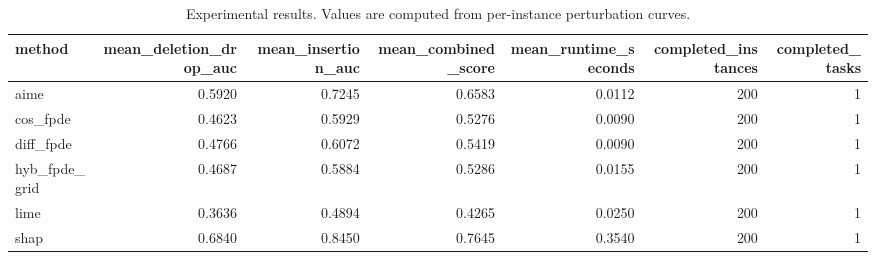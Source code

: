 \begin{table}[t]
\caption{Experimental results. Values are computed from per-instance perturbation curves.}
\label{tab:main_results_computed}
\centering
\begin{tabular}{lrrrrrr}
\toprule
method & mean\_deletion\_drop\_auc & mean\_insertion\_auc & mean\_combined\_score & mean\_runtime\_seconds & completed\_instances & completed\_tasks \\
\midrule
aime & 0.5920 & 0.7245 & 0.6583 & 0.0112 & 200 & 1 \\
cos\_fpde & 0.4623 & 0.5929 & 0.5276 & 0.0090 & 200 & 1 \\
diff\_fpde & 0.4766 & 0.6072 & 0.5419 & 0.0090 & 200 & 1 \\
hyb\_fpde\_grid & 0.4687 & 0.5884 & 0.5286 & 0.0155 & 200 & 1 \\
lime & 0.3636 & 0.4894 & 0.4265 & 0.0250 & 200 & 1 \\
shap & 0.6840 & 0.8450 & 0.7645 & 0.3540 & 200 & 1 \\
\bottomrule
\end{tabular}

\end{table}
